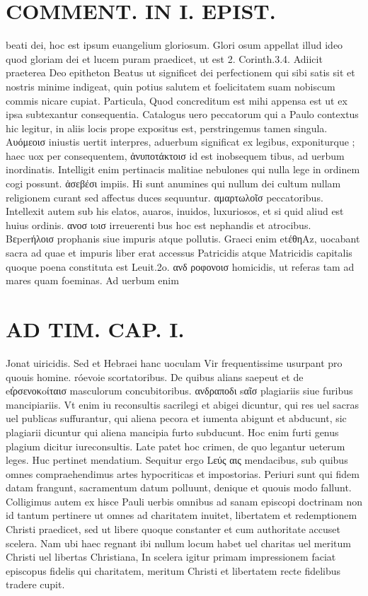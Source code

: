 \documentclass{article}
\begin{document}
\begin{pages}
\section*{COMMENT. IN I. EPIST. }\pstart beati dei, hoc est ipsum euangelium gloriosum. Glori osum appellat illud ideo quod gloriam dei et lucem puram praedicet, ut est 2. Corinth.3.4. Adiicit praeterea Deo epitheton Beatus ut significet dei perfectionem qui sibi satis sit et nostris minime indigeat, quin potius salutem et foelicitatem suam nobiscum commis nicare cupiat. Particula, Quod concreditum est mihi appensa est ut ex ipsa subtexantur consequentia. Catalogus uero peccatorum qui a Paulo contextus hic legitur, in aliis locis prope expositus est, perstringemus tamen singula. Aυόμεοισ iniustis uertit interpres, aduerbum significat ex legibus, exponiturque ; haec uox per consequentem, ἀνυποτάκτοισ id est inobsequem tibus, ad uerbum inordinatis. Intelligit enim pertinacis malitiae nebulones qui nulla lege in ordinem cogi possunt. ἀσεβέσι impiis. Hi sunt anumines qui nullum dei cultum nullam religionem curant sed affectus duces sequuntur. αμαρτωλοῖσ peccatoribus. Intellexit autem sub his elatos, auaros, inuidos, luxuriosos, et si quid aliud est huius ordinis. ανοσ ιoισ irreuerenti bus hoc est nephandis et atrocibus. Βεperήλοισ prophanis siue impuris atque pollutis. Graeci enim etέθηAz, uocabant sacra ad quae et impuris liber erat accessus Patricidis atque Matricidis capitalis quoque poena constituta est Leuit.2o. ανδ ροφονοισ homicidis, ut referas tam ad mares quam foeminas. Ad uerbum enim  \pend
\section*{AD TIM. CAP. I. }
\marginpar{[ p.102 ]}\pstart Jonat uiricidis. Sed et Hebraei hanc uoculam Vir frequentissime usurpant pro quouis homine. róevoie scortatoribus. De quibus alians saepeut et de et̓ρσενοκoίταισ masculorum concubitoribus. ανδραποδι sαῖσ plagiariis siue furibus mancipiariis. Vt enim iu reconsultis sacrilegi et abigei dicuntur, qui res uel sacras uel publicas suffurantur, qui aliena pecora et iumenta abigunt et abducunt, sic plagiarii dicuntur qui aliena mancipia furto subducunt. Hoc enim furti genus plagium dicitur iureconsultis. Late patet hoc crimen, de quo legantur ueterum leges. Huc pertinet mendatium. Sequitur ergo Lεύς αις mendacibus, sub quibus omnes compraehendimus artes hypocriticas et impostorias. Periuri sunt qui fidem datam frangunt, sacramentum datum polluunt, denique et quouis modo fallunt. Colligimus autem ex hisce Pauli uerbis omnibus ad sanam episcopi doctrinam non id tantum pertinere ut omnes ad charitatem inuitet, libertatem et redemptionem Christi praedicet, sed ut libere quoque constanter et cum authoritate accuset scelera. Nam ubi haec regnant ibi nullum locum habet uel charitas uel meritum Christi uel libertas Christiana, In scelera igitur primam impressionem faciat episcopus fidelis qui charitatem, meritum Christi et libertatem recte fidelibus tradere cupit.  \pend

\end{pages}
\end{document}
